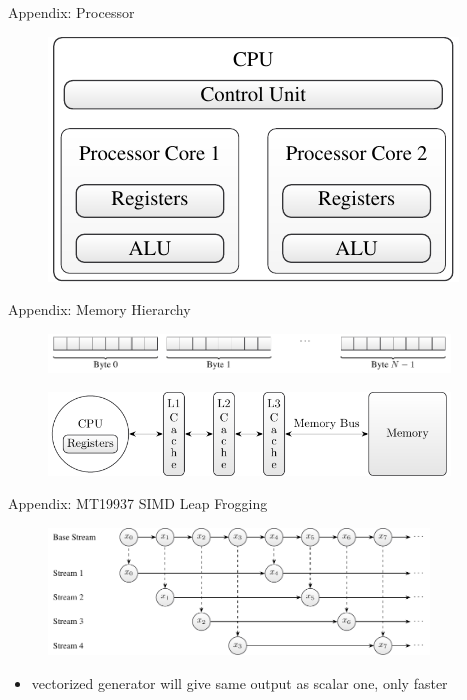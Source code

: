 \documentclass[aspectratio=169]{beamer}
\begin{document}
  \begin{frame}{Appendix: Processor}
    \begin{figure}
      \includegraphics[height=0.5\textheight]{figures/cpu_components.pdf}
    \end{figure}
  \end{frame}

  \begin{frame}{Appendix: Memory Hierarchy}
    \begin{figure}
      \includegraphics[width=0.95\textwidth]{figures/memory.pdf}
    \end{figure}
    \begin{figure}
      \includegraphics[width=0.95\textwidth]{figures/memory_hierarchy.pdf}
    \end{figure}
  \end{frame}

  \begin{frame}{Appendix: MT19937 SIMD Leap Frogging}
    \begin{figure}
      \includegraphics[width=0.9\textwidth]{figures/leapfrogging_multiple_streams.pdf}
    \end{figure}
    \begin{itemize}
      \item vectorized generator will give same output as scalar one, only faster
    \end{itemize}
  \end{frame}
\end{document}
